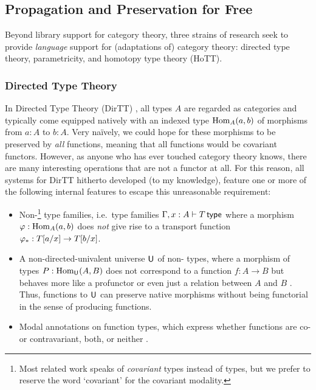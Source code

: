 \documentclass[twoLevelNum]{higherStructures} %
\begin{document}
\subsection{Propagation and Preservation for Free}
Beyond library support for category theory, three strains of research seek to provide \emph{language} support for (adaptations of) category theory:
directed type theory, parametricity, and homotopy type theory (HoTT).

\subsubsection{Directed Type Theory}
In Directed Type Theory (DirTT) \cite{2dtt,riehl-shulman-dtt,north-dirhott,weaver-licata-dua,dua-simplicial}, all types $A$ are regarded as categories and typically come equipped natively with an indexed type ${\mathrm{Hom}}_A(a, b)$ of morphisms from $a : A$ to $b : A$.
Very na\"ively, we could hope for these morphisms to be preserved by \emph{all} functions, meaning that all functions would be covariant functors.
However, as anyone who has ever touched category theory knows, there are many interesting operations that are not a functor at all.
For this reason, all systems for DirTT hitherto developed (to my knowledge), feature one or more of the following internal features to escape this unreasonable requirement:
\begin{itemize}
	\item Non-\covarfib{}\footnote{Most related work speaks of \emph{covariant} types instead of \covarfib{} types, but we prefer to reserve the word `covariant' for the covariant modality.} type families, i.e.\ type families $\Gamma, x : A \vdash T \,\mathsf{type}$ where a morphism $\varphi : {\mathrm{Hom}}_A(a, b)$ does \emph{not} give rise to a transport function $\varphi_* : T[a/x] \to T[b/x]$.
	\item A non-directed-univalent universe $\mathsf{U}_{}$ of non-\covarfib{} types, where a morphism of types $P : {\mathrm{Hom}}_{\mathsf{U}_{}}(A, B)$ does not correspond to a function $f : A \to B$ but behaves more like a profunctor or even just a relation between $A$ and $B$ \cite{riehl-shulman-dtt,weaver-licata-dua,dua-simplicial}.
	Thus, functions to $\mathsf{U}_{}$ can preserve native morphisms without being functorial in the sense of producing functions.
	\item Modal annotations on function types, which express whether functions are co- or contravariant, both, or neither \cite{abel-polarized,2dtt,mathesis,north-dirhott,dua-simplicial}.
\end{itemize}
\end{document}
